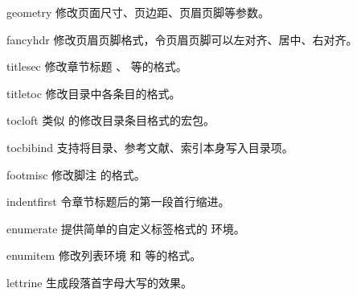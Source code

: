\begin{pkglist}
  \item[geometry] 修改页面尺寸、页边距、页眉页脚等参数。
  \item[fancyhdr] 修改页眉页脚格式，令页眉页脚可以左对齐、居中、右对齐。
  \item[titlesec] 修改章节标题 、 等的格式。
  \item[titletoc] 修改目录中各条目的格式。
  \item[tocloft]  类似  的修改目录条目格式的宏包。
  \item[tocbibind] 支持将目录、参考文献、索引本身写入目录项。
  \item[footmisc] 修改脚注  的格式。
  \item[indentfirst] 令章节标题后的第一段首行缩进。
  \item[enumerate] 提供简单的自定义标签格式的  环境。
  \item[enumitem] 修改列表环境  和  等的格式。
  \item[lettrine] 生成段落首字母大写的效果。
\end{pkglist}

\endinput
